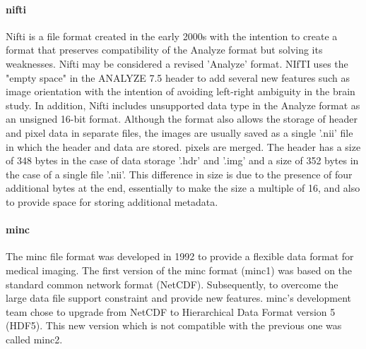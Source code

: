 \paragraph{\acs{nifti}}
Nifti is a file format created in the early 2000s with the intention to create a format that preserves compatibility of the Analyze format but solving its weaknesses. Nifti may be considered a revised 'Analyze' format. NIfTI uses the "empty space" in the ANALYZE 7.5 header to add several new features such as image orientation with the intention of avoiding left-right ambiguity in the brain study. In addition, Nifti includes unsupported data type in the Analyze format as an unsigned 16-bit format. Although the format also allows the storage of header and pixel data in separate files, the images are usually saved as a single '.nii' file in which the header and data are stored. pixels are merged. The header has a size of 348 bytes in the case of data storage '.hdr' and '.img' and a size of 352 bytes in the case of a single file '.nii'. This difference in size is due to the presence of four additional bytes at the end, essentially to make the size a multiple of 16, and also to provide space for storing additional metadata.\cite{NIF:1, ME:1}
\paragraph{\acs{minc}}
The \acs{minc} file format was developed in 1992 to provide a flexible data format for medical imaging. The first version of the \acs{minc} format (\acs{minc}1) was based on the standard common network format (NetCDF). Subsequently, to overcome the large data file support constraint and provide new features. \acs{minc}'s development team chose to upgrade from NetCDF to Hierarchical Data Format version 5 (HDF5). This new version which is not compatible with the previous one was called \acs{minc}2.\cite{MIN:1, ME:1}
